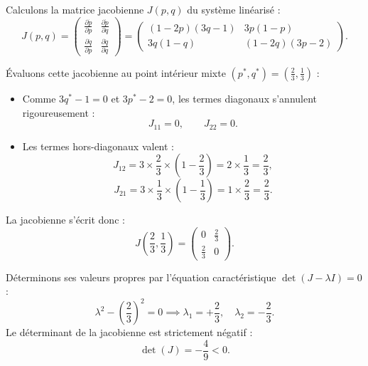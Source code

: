 \documentclass[11pt,a4paper]{article}
\begin{document}
Calculons la matrice jacobienne $J(p, q)$ du système linéarisé :
\begin{equation}
J(p, q) = \begin{pmatrix}
\frac{\partial \dot{p}}{\partial p} & \frac{\partial \dot{p}}{\partial q} \\
\frac{\partial \dot{q}}{\partial p} & \frac{\partial \dot{q}}{\partial q}
\end{pmatrix}
= \begin{pmatrix}
(1 - 2p)(3q - 1) & 3p(1 - p) \\
3q(1 - q) & (1 - 2q)(3p - 2)
\end{pmatrix}.
\end{equation}

Évaluons cette jacobienne au point intérieur mixte $(p^*, q^*) = \left(\frac{2}{3}, \frac{1}{3}\right)$ :
\begin{itemize}[leftmargin=1.5em]
    \item Comme $3q^* - 1 = 0$ et $3p^* - 2 = 0$, les termes diagonaux s'annulent rigoureusement :
    \[
    J_{11} = 0, \qquad J_{22} = 0.
    \]
    \item Les termes hors-diagonaux valent :
    \[
    J_{12} = 3 \times \frac{2}{3} \times \left(1 - \frac{2}{3}\right) = 2 \times \frac{1}{3} = \frac{2}{3},
    \]
    \[
    J_{21} = 3 \times \frac{1}{3} \times \left(1 - \frac{1}{3}\right) = 1 \times \frac{2}{3} = \frac{2}{3}.
    \]
\end{itemize}

La jacobienne s'écrit donc :
\begin{equation}
J\left(\frac{2}{3}, \frac{1}{3}\right) = \begin{pmatrix}
0 & \frac{2}{3} \\
\frac{2}{3} & 0
\end{pmatrix}.
\end{equation}

Déterminons ses valeurs propres par l'équation caractéristique $\det(J - \lambda I) = 0$ :
\[
\lambda^2 - \left(\frac{2}{3}\right)^2 = 0 \implies \lambda_1 = +\frac{2}{3}, \quad \lambda_2 = -\frac{2}{3}.
\]
Le déterminant de la jacobienne est strictement négatif :
\begin{equation}
\det(J) = - \frac{4}{9} < 0.
\end{equation}
\end{document}

